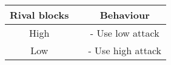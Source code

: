 \documentclass{article}
\begin{document}
\begin{landscape}

\begin{table}[h!]
  \begin{center}
    \begin{tabular*}{7cm}{c|c|c}
      \textbf{Rival blocks} & \textbf{} & \textbf{Behaviour}\\
      \hline
      High & & - Use low attack\\
      \hline
      Low & & - Use high attack\\
      \hline
        \end{tabular*}
  \end{center}
\end{table}

\end{landscape}

\newpage
\end{document}
